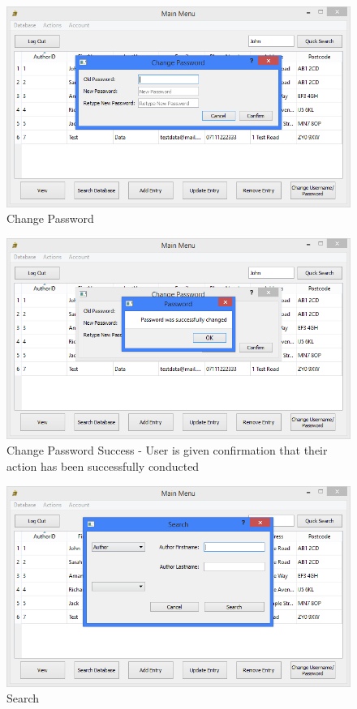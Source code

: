 \begin{figure}[H]
    \caption{Change Password} \label{fig:ChangePassword}
    \includegraphics[width=\textwidth]{./Maintenance/UserInterface/ChangePassword.png}
\end{figure}

\begin{figure}[H]
    \caption{Change Password Success - User is given confirmation that their action has been successfully conducted} \label{fig:ChangePasswordSuccess}
    \includegraphics[width=\textwidth]{./Maintenance/UserInterface/ChangePasswordSuccess.png}
\end{figure}

\begin{figure}[H]
    \caption{Search} \label{fig:Search}
    \includegraphics[width=\textwidth]{./Maintenance/UserInterface/Search.png}
\end{figure}

